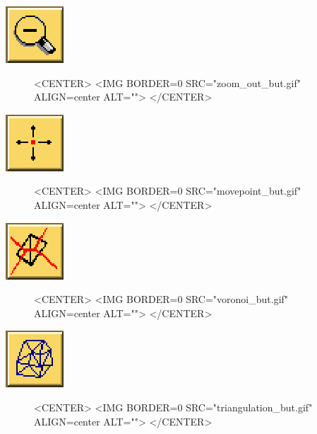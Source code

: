 \begin{ccTexOnly}
\mbox{\includegraphics{zoom_out_but.eps}}
\end{ccTexOnly}
\begin{figure}
\begin{ccHtmlOnly}
<CENTER>
<IMG BORDER=0 SRC="zoom_out_but.gif"  ALIGN=center  ALT="">
</CENTER>
\end{ccHtmlOnly}
\end{figure}

\begin{ccTexOnly}
\mbox{\includegraphics{movepoint_but.eps}}
\end{ccTexOnly}
\begin{figure}
\begin{ccHtmlOnly}
<CENTER>
<IMG BORDER=0 SRC="movepoint_but.gif"  ALIGN=center  ALT="">
</CENTER>
\end{ccHtmlOnly}
\end{figure}

\begin{ccTexOnly}
\mbox{\includegraphics{voronoi_but.eps}}
\end{ccTexOnly}
\begin{figure}
\begin{ccHtmlOnly}
<CENTER>
<IMG BORDER=0 SRC="voronoi_but.gif"  ALIGN=center  ALT="">
</CENTER>
\end{ccHtmlOnly}
\end{figure}

\begin{ccTexOnly}
\mbox{\includegraphics{triangulation_but.eps}}
\end{ccTexOnly}
\begin{figure}
\begin{ccHtmlOnly}
<CENTER>
<IMG BORDER=0 SRC="triangulation_but.gif"  ALIGN=center  ALT="">
</CENTER>
\end{ccHtmlOnly}
\end{figure}

